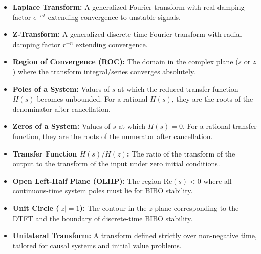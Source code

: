 \documentclass[12pt,a4paper]{article}
\begin{document}
\begin{tcolorbox}[defbox, title={\textbf{One-Line Definitions}}]
\begin{itemize}[leftmargin=*, itemsep=2pt, topsep=0pt]
  \item \textbf{Laplace Transform:} A generalized Fourier transform with real damping factor $e^{-\sigma t}$ extending convergence to unstable signals.
  \item \textbf{Z-Transform:} A generalized discrete-time Fourier transform with radial damping factor $r^{-n}$ extending convergence.
  \item \textbf{Region of Convergence (ROC):} The domain in the complex plane ($s$ or $z$) where the transform integral/series converges absolutely.
  \item \textbf{Poles of a System:} Values of $s$ at which the reduced transfer function $H(s)$ becomes unbounded. For a rational $H(s)$, they are the roots of the denominator after cancellation.
  \item \textbf{Zeros of a System:} Values of $s$ at which $H(s)=0$. For a rational transfer function, they are the roots of the numerator after cancellation.
  \item \textbf{Transfer Function $H(s) / H(z)$:} The ratio of the transform of the output to the transform of the input under zero initial conditions.
  \item \textbf{Open Left-Half Plane (OLHP):} The region $\text{Re}(s) < 0$ where all continuous-time system poles must lie for BIBO stability.
  \item \textbf{Unit Circle ($|z| = 1$):} The contour in the $z$-plane corresponding to the DTFT and the boundary of discrete-time BIBO stability.
  \item \textbf{Unilateral Transform:} A transform defined strictly over non-negative time, tailored for causal systems and initial value problems.
\end{itemize}
\end{tcolorbox}
\end{document}
